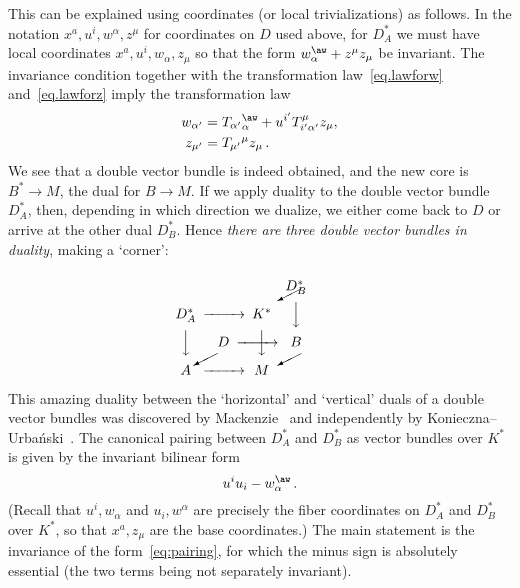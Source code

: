 \documentclass[12pt,reqno,a4paper]{amsart}
\theoremstyle{definition}
\begin{document}
This can be explained using coordinates (or local trivializations) as follows.  In the notation $x^a,u^i,w^{\alpha},z^{\mu}$ for coordinates on $D$ used above, for $D^*_A$ we must have local coordinates $x^a,u^i,w_{\alpha},z_{\mu}$ so that the form $w^\aw_{\alpha}+z^{\mu}z_{\mu}$ be invariant. The invariance condition together with the transformation law~\eqref{eq.lawforw} and~\eqref{eq.lawforz}  imply the transformation law
\begin{align}
    w_{{\alpha}'}&=T_{{\alpha}'}{}^\aw_{\alpha}+ u^{i'}T_{i'{\alpha}'}^{\mu}z_{\mu}, \label{eq.lawforwniz} \\
    z_{\mu'}&=T_{\mu'}{}^{\mu}z_{\mu}\,.\label{eq.lawforzniz}
\end{align}
We see that a double vector bundle is indeed obtained, and the new core is $B^*\to M$, the dual  for $B\to M$. If we apply duality to the double vector bundle $D^*_A$, then, depending in which direction we dualize, we either come back to $D$ or arrive at the other dual $D^*_B$. Hence \textit{there are three double vector bundles in duality}, making a `corner':
\begin{equation}
    \begin{picture}(300,80)(0,65)
    \put(90,90){${\begin{CD} {D^*_A}  @>>>   K^*\\
                @VVV  @VVV \\
               A@>>>M\end{CD}}$}
    \put(120,110){$\begin{CD} {} @.   D^*_B\\
                @.  @VVV \\
               D@>>>B\end{CD}$}
    {\put(120,84){\vector(-2,-1){17}}}
    {\put(180,84){\vector(-2,-1){17}}}
    
    {\put(180,130){\vector(-2,-1){17}}}
    \end{picture}
\end{equation}
This amazing duality between the `horizontal' and `vertical'  duals
of a double vector bundles was discovered by
Mackenzie~\cite{mackenzie:sympldouble} and independently by
Konieczna--Urba\'{n}ski~\cite{konieczna:duality}. The canonical
pairing between $D^*_A$ and $D^*_B$ as vector bundles over $K^*$ is
given by the invariant bilinear form
\begin{equation}\label{eq:pairing}
    u^iu_i-w^\aw_{\alpha}\,.
\end{equation}
(Recall that $u^i,w_{\alpha}$ and $u_i,w^{\alpha}$ are precisely the fiber
coordinates  on $D^*_A$ and $D^*_B$ over $K^*$, so that
$x^a,z_{\mu}$ are the base coordinates.) The main statement is the
invariance of the form~\eqref{eq:pairing}, for which the minus sign
is absolutely essential (the two terms being not separately
invariant).
\end{document}
